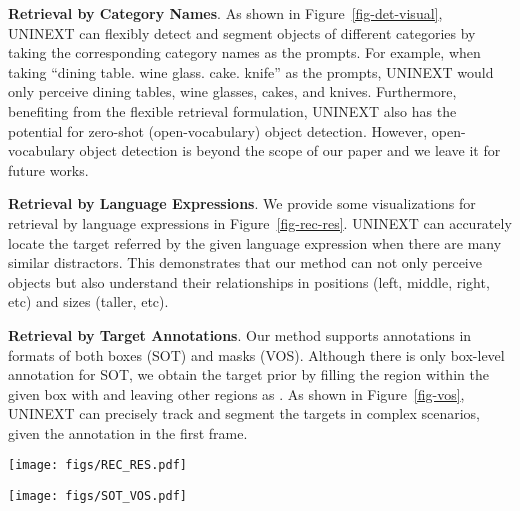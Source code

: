 \documentclass[10pt,twocolumn,letterpaper]{article}
\begin{document}
\textbf{Retrieval by Category Names}. As shown in Figure~\ref{fig-det-visual}, UNINEXT can flexibly detect and segment objects of different categories by taking the corresponding category names as the prompts. For example, when taking ``dining table. wine glass. cake. knife'' as the prompts, UNINEXT would only perceive dining tables, wine glasses, cakes, and knives. Furthermore, benefiting from the flexible retrieval formulation, UNINEXT also has the potential for zero-shot (open-vocabulary) object detection. However, open-vocabulary object detection is beyond the scope of our paper and we leave it for future works.

\textbf{Retrieval by Language Expressions}. We provide some visualizations for retrieval by language expressions in Figure~\ref{fig-rec-res}. UNINEXT can accurately locate the target referred by the given language expression when there are many similar distractors. This demonstrates that our method can not only perceive objects but also understand their relationships in positions (left, middle, right, etc) and sizes (taller, etc). 

\textbf{Retrieval by Target Annotations}. Our method supports annotations in formats of both boxes (SOT) and masks (VOS). Although there is only box-level annotation for SOT, we obtain the target prior by filling the region within the given box with  and leaving other regions as . As shown in Figure~\ref{fig-vos}, UNINEXT can precisely track and segment the targets in complex scenarios, given the annotation in the first frame.


\begin{figure*}[!t]
  \begin{center}
\texttt{[image: figs/REC\_RES.pdf]}
  \end{center}
  \vspace{-5mm}
  \caption{Illustration of \textbf{retrieval by language expressions}. Better view in color on screen.}
  \label{fig-rec-res}
\vspace{-3mm}
\end{figure*}

\begin{figure*}[!t]
  \begin{center}
\texttt{[image: figs/SOT\_VOS.pdf]}
  \end{center}
  \vspace{-5mm}
  \caption{Illustration of \textbf{retrieval by target annotations}. UNINEXT can flexibly perceive different objects according to the box or mask annotations given in the first frame. Better view in color on screen.} \label{fig-vos}
\vspace{-3mm}
\end{figure*}
\end{document}

